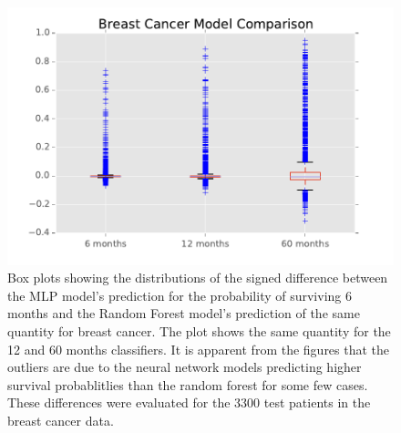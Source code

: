 \documentclass[a4paper,11pt]{article}
\begin{document}
\begin{figure}[tbp]
\centering 
\begin{center}
\includegraphics[width=.90\textwidth,origin=c]{breastbox.pdf}
\caption{\label{fig:breastbox} Box plots showing the distributions of the signed difference between the MLP model's prediction for the probability of surviving 6 months and the Random Forest model's prediction of the same quantity for breast cancer. The plot shows the same quantity for the 12 and 60 months classifiers. It is apparent from the figures that the outliers are due to the neural network models predicting higher survival probablitlies than the random forest for some few cases. These differences were evaluated for the 3300 test patients in the breast cancer data.}
\end{center}
\end{figure}
\end{document}
